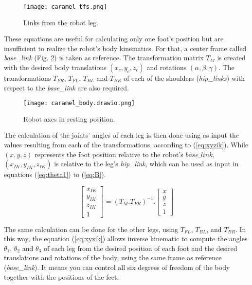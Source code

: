 \documentclass[conference]{IEEEtran}
\begin{document}
\begin{figure}[htbp]
  \centering
  \texttt{[image: caramel\_tfs.png]}
  
  \caption{Links from the robot leg.}
  \label{fig:caramel_tfs}
\end{figure}

These equations are useful for calculating only one foot's position but are insufficient to realize the robot's body kinematics. For that, a center frame called \textit{base\_link} (Fig. \ref{fig:caramel_body}) is taken as reference. The transformation matrix $T_M$ is created with the desired body translations $(x_c, y_c, z_c)$ and rotations $(\alpha, \beta, \gamma)$. The transformations $T_{FR}$, $T_{FL}$, $T_{BL}$ and $T_{BR}$ of each of the shoulders (\textit{hip\_links}) with respect to the \textit{base\_link} are also required.

\begin{figure}[htbp]
  \centering
  \vspace{-0.75cm}
  \texttt{[image: caramel\_body.drawio.png]}
  
  \caption{Robot axes in resting position.}
  \label{fig:caramel_body}
\end{figure}

The calculation of the joints' angles of each leg is then done using as input the values resulting from each of the transformations, according to (\ref{eq:xyzik}). While $(x, y, z)$ represents the foot position relative to the robot's $base\_link$, $(x_{IK}, y_{IK}, z_{IK})$ is relative to the leg's \textit{hip\_link}, which can be used as input in equations (\ref{eq:theta1}) to (\ref{eq:B}). 

\begin{equation}
  \label{eq:xyzik}
  \begin{bmatrix}
    x_{IK} \\
    y_{IK} \\
    z_{IK} \\
    1
  \end{bmatrix}= (T_M.T_{FR})^{-1}.
  \begin{bmatrix}
    x \\
    y \\
    z \\
    1
  \end{bmatrix}
\end{equation}

The same calculation can be done for the other legs, using $T_{FL}$, $T_{BL}$, and $T_{BR}$. In this way, the equation (\ref{eq:xyzik}) allows inverse kinematic to compute the angles $\theta_1$, $\theta_2$ and $\theta_3$ of each leg from the desired position of each foot and the desired translations and rotations of the body, using the same frame as reference (\textit{base\_link}). It means you can control all six degrees of freedom of the body together with the positions of the feet.
\end{document}
